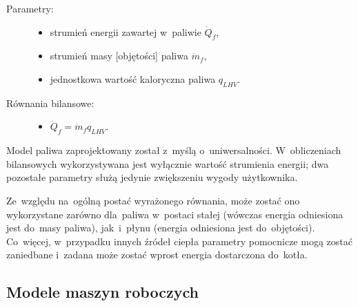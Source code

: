 \begin{description}

	\item[Parametry:] \hfill

		\begin{itemize}

			\item strumień energii zawartej w~paliwie $\dot Q_f$,

			\item strumień masy [objętości] paliwa $\dot m_f$,

			\item jednostkowa wartość kaloryczna paliwa $q_{LHV}$.

		\end{itemize}

	\item[Równania bilansowe:] \hfill

		\begin{itemize}

			\item $\dot Q_f = \dot m_f q_{LHV}$.

		\end{itemize}

\end{description}

Model paliwa zaprojektowany został z~myślą o~uniwersalności.
W~obliczeniach bilansowych wykorzystywana jest wyłącznie wartość
strumienia energii; dwa pozostałe parametry służą jedynie zwiększeniu
wygody użytkownika.

Ze~względu na~ogólną postać wyrażonego równania, może zostać ono
wykorzystane zarówno dla~paliwa w~postaci stałej (wówczas energia
odniesiona jest do~masy paliwa), jak~i~płynu (energia odniesiona jest
do~objętości). Co~więcej, w~przypadku innych źródeł ciepła parametry
pomocnicze mogą zostać zaniedbane i~zadana może zostać wprost energia
dostarczona do~kotła.


\subsection{Modele maszyn roboczych}

\newcommand\wykresTs[1]{
	\subfloat[][Wykres T-s przemiany]{
		\begin{tikzpicture}
			\begin{axis}[
				xtick=\empty,
				ytick=\empty,
				axis lines=left,
				ylabel=T,
				xlabel=s,
				height=5cm,
				clip=false,
				every axis x label/.style={at={(xticklabel cs:.95,.2cm)}},
				every axis y label/.style={at={(yticklabel cs:.9,.2cm)}}
			]
				\addplot+[no marks, smooth] table[x=s, y=T] {wykresy/_nasyc.txt};
				#1
			\end{axis}
		\end{tikzpicture}
	}
}




